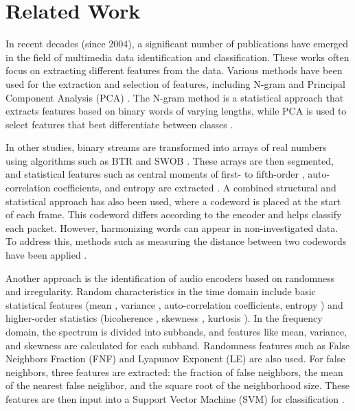 \section{Related Work}
In recent decades (since 2004), a significant number of publications have emerged in the field of multimedia data identification and classification. These works often focus on extracting different features from the data. Various methods have been used for the extraction and selection of features, including N-gram \cite{Fink2014n-Gram} and Principal Component Analysis (PCA) \cite{Gewers2021Principal}. The N-gram method is a statistical approach that extracts features based on binary words of varying lengths, while PCA is used to select features that best differentiate between classes \cite{Din2012Multimedia, Maithani2004Speech, Kant2010Identification}.

In other studies, binary streams are transformed into arrays of real numbers using algorithms such as BTR \cite{Lim2016BTR} and SWOB \cite{Ghataoura2009SWOB}. These arrays are then segmented, and statistical features such as central moments of first- to fifth-order \cite{Pébay2016Numerically}, auto-correlation \cite{Kant2010Identification} coefficients, and entropy \cite{Kant2010Identification} are extracted \cite{Tripathi2013A, Tripathi2014A}. A combined structural and statistical approach has also been used, where a codeword is placed at the start of each frame. This codeword differs according to the encoder and helps classify each packet. However, harmonizing words can appear in non-investigated data. To address this, methods such as measuring the distance between two codewords have been applied \cite{Jin2014Audio}.

Another approach is the identification of audio encoders based on randomness and irregularity. Random characteristics in the time domain include basic statistical features (mean \cite{Kant2010Identification}, variance \cite{Benetazzo2000Speech}, auto-correlation \cite{Kant2010Identification} coefficients, entropy \cite{Kant2010Identification}) and higher-order statistics (bicoherence \cite{Elgar1988Statistics}, skewness \cite{Benetazzo2000Speech}, kurtosis \cite{Benetazzo2000Speech}). In the frequency domain, the spectrum is divided into subbands, and features like mean, variance, and skewness are calculated for each subband. Randomness features such as False Neighbors Fraction (FNF) \cite{Koçal2008Chaotic-type} and Lyapunov Exponent (LE) \cite{Dingwell2006Lyapunov} are also used. For false neighbors, three features are extracted: the fraction of false neighbors, the mean of the nearest false neighbor, and the square root of the neighborhood size. These features are then input into a Support Vector Machine (SVM) for classification \cite{Hicsonmez2013Audio}.


